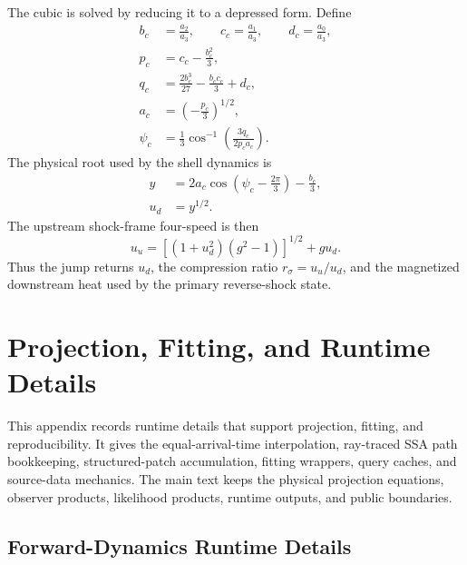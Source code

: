 \documentclass[twocolumn]{aastex702}
\begin{document}
The cubic is solved by reducing it to a depressed form.  Define
\begin{equation}
\begin{aligned}
b_c&=\frac{a_2}{a_3},\qquad
c_c=\frac{a_1}{a_3},\qquad
d_c=\frac{a_0}{a_3},\\
p_c&=c_c-\frac{b_c^2}{3},\\
q_c&=\frac{2b_c^3}{27}-\frac{b_cc_c}{3}+d_c,\\
a_c&=\left(-\frac{p_c}{3}\right)^{1/2},\\
\psi_c&=\frac{1}{3}\cos^{-1}\!\left(\frac{3q_c}{2p_ca_c}\right).
\end{aligned}
\end{equation}
The physical root used by the shell dynamics is
\begin{equation}
\begin{aligned}
y&=2a_c\cos\left(\psi_c-\frac{2\pi}{3}\right)-\frac{b_c}{3},\\
u_d&=y^{1/2}.
\end{aligned}
\end{equation}
The upstream shock-frame four-speed is then
\begin{equation}
u_u=\left[(1+u_d^2)(g^2-1)\right]^{1/2}+g u_d .
\end{equation}
Thus the jump returns \(u_d\), the compression ratio \(r_\sigma=u_u/u_d\), and
the magnetized downstream heat used by the primary reverse-shock state.

\section{Projection, Fitting, and Runtime Details} \label{app:projection-runtime}

This appendix records runtime details that support projection, fitting, and
reproducibility.  It gives the equal-arrival-time interpolation, ray-traced SSA
path bookkeeping, structured-patch accumulation, fitting wrappers, query caches,
and source-data mechanics.  The main text keeps the physical projection
equations, observer products, likelihood products, runtime outputs, and public
boundaries.

\subsection{Forward-Dynamics Runtime Details}
\end{document}
